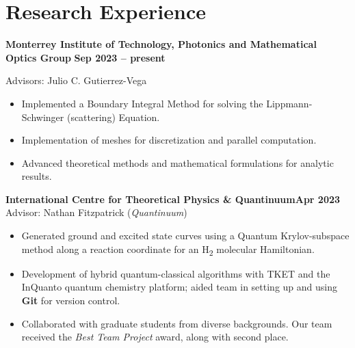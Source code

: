 \section{Research Experience}
\textbf{Monterrey Institute of Technology, Photonics and Mathematical Optics Group} \hfill{\bf Sep 2023 -- present}

Advisors: Julio C. Gutierrez-Vega  \href{https://scholar.google.com/citations?user=SXtXBWkAAAAJ&hl=en}{\aiGoogleScholar}

\begin{itemize}
\setlength{\itemsep}{0.5em}
    \item Implemented a Boundary Integral Method for solving the Lippmann-Schwinger (scattering) Equation.
    \item Implementation of meshes for discretization and parallel computation.
    \item Advanced theoretical methods and mathematical formulations for analytic results.
\end{itemize}
\medskip
{\bf International Centre for Theoretical Physics \& Quantinuum}\hfill{\bf Apr 2023}\\
Advisor: Nathan Fitzpatrick  (\emph{Quantinuum})
\begin{itemize}
\setlength{\itemsep}{0.5em}
    \item Generated ground and excited state curves using a Quantum Krylov-subspace method along a reaction coordinate for an H\textsubscript{2} molecular Hamiltonian.
    \item Development of hybrid quantum-classical algorithms with TKET and the InQuanto quantum chemistry platform; aided team in setting up and using \textbf{Git} for version control.
    \item Collaborated with graduate students from diverse backgrounds. Our team received the \emph{Best Team Project} award, along with second place.
\end{itemize}
\medskip
% 
